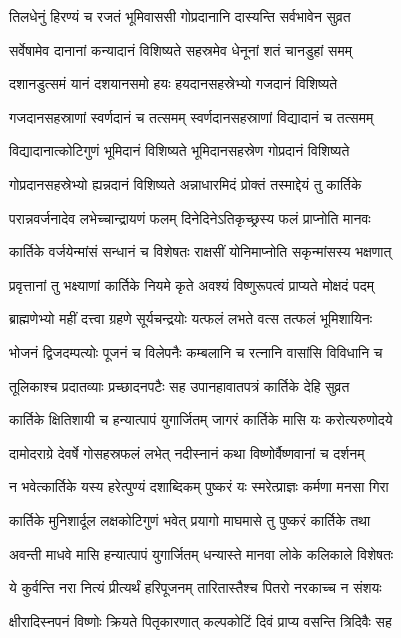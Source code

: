 \twolineshloka
{तिलधेनुं हिरण्यं च रजतं भूमिवाससी}
{गोप्रदानानि दास्यन्ति सर्वभावेन सुव्रत} %

\twolineshloka
{सर्वेषामेव दानानां कन्यादानं विशिष्यते}
{सहस्रमेव धेनूनां शतं चानडुहां समम्} %

\twolineshloka
{दशानडुत्समं यानं दशयानसमो हयः}
{हयदानसहस्रेभ्यो गजदानं विशिष्यते} %

\twolineshloka
{गजदानसहस्राणां स्वर्णदानं च तत्समम्}
{स्वर्णदानसहस्राणां विद्यादानं च तत्समम्} %

\twolineshloka
{विद्यादानात्कोटिगुणं भूमिदानं विशिष्यते}
{भूमिदानसहस्रेण गोप्रदानं विशिष्यते} %

\twolineshloka
{गोप्रदानसहस्रेभ्यो ह्यन्नदानं विशिष्यते}
{अन्नाधारमिदं प्रोक्तं तस्माद्देयं तु कार्तिके} %

\twolineshloka
{परान्नवर्जनादेव लभेच्चान्द्रायणं फलम्}
{दिनेदिनेऽतिकृच्छ्रस्य फलं प्राप्नोति मानवः} %

\twolineshloka
{कार्तिके वर्जयेन्मांसं सन्धानं च विशेषतः}
{राक्षसीं योनिमाप्नोति सकृन्मांसस्य भक्षणात्} %

\twolineshloka
{प्रवृत्तानां तु भक्ष्याणां कार्तिके नियमे कृते}
{अवश्यं विष्णुरूपत्वं प्राप्यते मोक्षदं पदम्} %

\twolineshloka
{ब्राह्मणेभ्यो महीं दत्त्वा ग्रहणे सूर्यचन्द्रयोः}
{यत्फलं लभते वत्स तत्फलं भूमिशायिनः} %

\twolineshloka
{भोजनं द्विजदम्पत्योः पूजनं च विलेपनैः}
{कम्बलानि च रत्नानि वासांसि विविधानि च} %

\twolineshloka
{तूलिकाश्च प्रदातव्याः प्रच्छादनपटैः सह}
{उपानहावातपत्रं कार्तिके देहि सुव्रत} %

\twolineshloka
{कार्तिके क्षितिशायी च हन्यात्पापं युगार्जितम्}
{जागरं कार्तिके मासि यः करोत्यरुणोदये} %

\twolineshloka
{दामोदराग्रे देवर्षे गोसहस्रफलं लभेत्}
{नदीस्नानं कथा विष्णोर्वैष्णवानां च दर्शनम्} %

\twolineshloka
{न भवेत्कार्तिके यस्य हरेत्पुण्यं दशाब्दिकम्}
{पुष्करं यः स्मरेत्प्राज्ञः कर्मणा मनसा गिरा} %

\twolineshloka
{कार्तिके मुनिशार्दूल लक्षकोटिगुणं भवेत्}
{प्रयागो माघमासे तु पुष्करं कार्तिके तथा} %

\twolineshloka
{अवन्ती माधवे मासि हन्यात्पापं युगार्जितम्}
{धन्यास्ते मानवा लोके कलिकाले विशेषतः} %

\twolineshloka
{ये कुर्वन्ति नरा नित्यं प्रीत्यर्थं हरिपूजनम्}
{तारितास्तैश्च पितरो नरकाच्च न संशयः} %

\twolineshloka
{क्षीरादिस्नपनं विष्णोः क्रियते पितृकारणात्}
{कल्पकोटिं दिवं प्राप्य वसन्ति त्रिदिवैः सह} %

